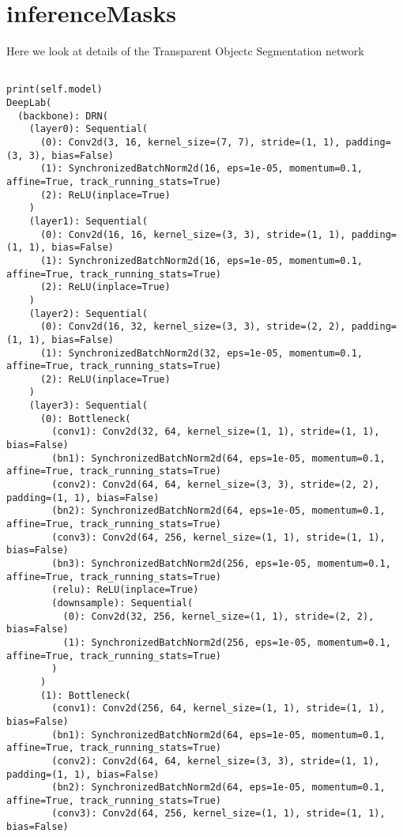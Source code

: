 \section{inferenceMasks}

Here we look at details of the Transparent Objectc Segmentation network

\begin{verbatim}

print(self.model)
DeepLab(
  (backbone): DRN(
    (layer0): Sequential(
      (0): Conv2d(3, 16, kernel_size=(7, 7), stride=(1, 1), padding=(3, 3), bias=False)
      (1): SynchronizedBatchNorm2d(16, eps=1e-05, momentum=0.1, affine=True, track_running_stats=True)
      (2): ReLU(inplace=True)
    )
    (layer1): Sequential(
      (0): Conv2d(16, 16, kernel_size=(3, 3), stride=(1, 1), padding=(1, 1), bias=False)
      (1): SynchronizedBatchNorm2d(16, eps=1e-05, momentum=0.1, affine=True, track_running_stats=True)
      (2): ReLU(inplace=True)
    )
    (layer2): Sequential(
      (0): Conv2d(16, 32, kernel_size=(3, 3), stride=(2, 2), padding=(1, 1), bias=False)
      (1): SynchronizedBatchNorm2d(32, eps=1e-05, momentum=0.1, affine=True, track_running_stats=True)
      (2): ReLU(inplace=True)
    )
    (layer3): Sequential(
      (0): Bottleneck(
        (conv1): Conv2d(32, 64, kernel_size=(1, 1), stride=(1, 1), bias=False)
        (bn1): SynchronizedBatchNorm2d(64, eps=1e-05, momentum=0.1, affine=True, track_running_stats=True)
        (conv2): Conv2d(64, 64, kernel_size=(3, 3), stride=(2, 2), padding=(1, 1), bias=False)
        (bn2): SynchronizedBatchNorm2d(64, eps=1e-05, momentum=0.1, affine=True, track_running_stats=True)
        (conv3): Conv2d(64, 256, kernel_size=(1, 1), stride=(1, 1), bias=False)
        (bn3): SynchronizedBatchNorm2d(256, eps=1e-05, momentum=0.1, affine=True, track_running_stats=True)
        (relu): ReLU(inplace=True)
        (downsample): Sequential(
          (0): Conv2d(32, 256, kernel_size=(1, 1), stride=(2, 2), bias=False)
          (1): SynchronizedBatchNorm2d(256, eps=1e-05, momentum=0.1, affine=True, track_running_stats=True)
        )
      )
      (1): Bottleneck(
        (conv1): Conv2d(256, 64, kernel_size=(1, 1), stride=(1, 1), bias=False)
        (bn1): SynchronizedBatchNorm2d(64, eps=1e-05, momentum=0.1, affine=True, track_running_stats=True)
        (conv2): Conv2d(64, 64, kernel_size=(3, 3), stride=(1, 1), padding=(1, 1), bias=False)
        (bn2): SynchronizedBatchNorm2d(64, eps=1e-05, momentum=0.1, affine=True, track_running_stats=True)
        (conv3): Conv2d(64, 256, kernel_size=(1, 1), stride=(1, 1), bias=False)

\end{verbatim}
